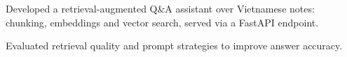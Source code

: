 
\vspace{3pt}
\begin{resume_list}
  \item Developed a retrieval-augmented Q\&A assistant over Vietnamese notes: chunking, embeddings and vector search, served via a FastAPI endpoint.
  \item Evaluated retrieval quality and prompt strategies to improve answer accuracy.
\end{resume_list}
